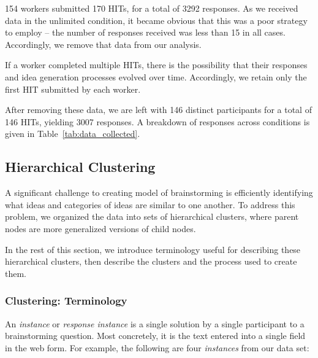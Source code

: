 154 workers submitted 170 HITs, for a total of 3292 responses. As we received data in the unlimited condition, it became obvious that this was a poor strategy to employ -- the number of responses received was less than 15 in all cases. Accordingly, we remove that data from our analysis.

If a worker completed multiple HITs, there is the possibility that their responses and idea generation processes evolved over time. Accordingly, we retain only the first HIT submitted by each worker.

After removing these data, we are left with 146 distinct participants for a total of 146 HITs, yielding 3007 responses. A breakdown of responses across conditions is given in Table~\ref{tab:data_collected}.



\subsection{Hierarchical Clustering}
A significant challenge to creating model of brainstorming is efficiently identifying what ideas and categories of ideas are similar to one another. To address this problem, we organized the data into sets of hierarchical clusters, where parent nodes are more generalized versions of child nodes. %

In the rest of this section, we introduce terminology useful for describing these hierarchical clusters, then describe the clusters and the process used to create them.

\subsubsection{Clustering: Terminology}
An \emph{instance} or \emph{response instance} is a single solution by a single participant to a brainstorming question. Most concretely, it is the text entered into a single field in the web form. For example, the following are four \emph{instances} from our data set:

